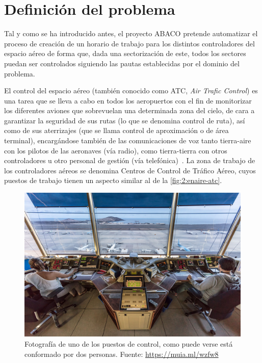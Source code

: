 \graphicspath{{capitulos/Capitulo2-Definicion-del-problema/recursos/}}

\section{Definición del problema} \label{apartado:2}

Tal y como se ha introducido antes, el proyecto ABACO pretende automatizar el proceso de creación de un horario de trabajo para
los distintos controladores del espacio aéreo de forma que, dada una sectorización de este, todos los sectores puedan ser
controlados siguiendo las pautas establecidas por el dominio del problema.

El control del espacio aéreo (también conocido como ATC, \textit{Air Trafic Control}) es una tarea que se lleva a cabo
en todos los aeropuertos con el fin de monitorizar los diferentes aviones que sobrevuelan una determinada zona del cielo,
de cara a garantizar la seguridad de sus rutas (lo que se denomina control de ruta), así como de sus aterrizajes
(que se llama control de aproximación o de área terminal), encargándose también de las comunicaciones de voz tanto
tierra-aire con los pilotos de las aeronaves (vía radio), como tierra-tierra con otros controladores u otro personal
de gestión (vía telefónica)~\cite{ENAIRE-web}.
La zona de trabajo de los controladores aéreos se denomina Centros de Control de Tráfico Aéreo, cuyos puestos de 
trabajo tienen un aspecto similar al de la \autoref{fig:2:enaire-atc}.

\begin{figure}[htbp]
    \centering
    \includegraphics[width=0.7\linewidth]{ENAIRE-ATC}
    \caption{Fotografía de uno de los puestos de control, como puede verse está conformado por dos personas. Fuente: \url{https://muia.ml/wzfw8}}
    \label{fig:2:enaire-atc}
\end{figure}


